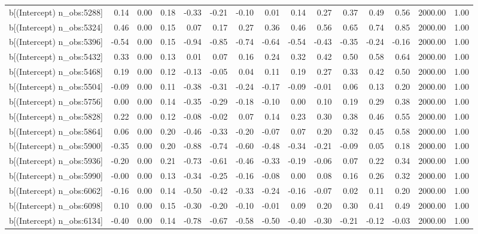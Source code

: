 \begin{table}[ht]
\begin{tabular}{rrrrrrrrrrrrrrr}
  b[(Intercept) n\_obs:5288] & 0.14 & 0.00 & 0.18 & -0.33 & -0.21 & -0.10 & 0.01 & 0.14 & 0.27 & 0.37 & 0.49 & 0.56 & 2000.00 & 1.00 \\ 
  b[(Intercept) n\_obs:5324] & 0.46 & 0.00 & 0.15 & 0.07 & 0.17 & 0.27 & 0.36 & 0.46 & 0.56 & 0.65 & 0.74 & 0.85 & 2000.00 & 1.00 \\ 
  b[(Intercept) n\_obs:5396] & -0.54 & 0.00 & 0.15 & -0.94 & -0.85 & -0.74 & -0.64 & -0.54 & -0.43 & -0.35 & -0.24 & -0.16 & 2000.00 & 1.00 \\ 
  b[(Intercept) n\_obs:5432] & 0.33 & 0.00 & 0.13 & 0.01 & 0.07 & 0.16 & 0.24 & 0.32 & 0.42 & 0.50 & 0.58 & 0.64 & 2000.00 & 1.00 \\ 
  b[(Intercept) n\_obs:5468] & 0.19 & 0.00 & 0.12 & -0.13 & -0.05 & 0.04 & 0.11 & 0.19 & 0.27 & 0.33 & 0.42 & 0.50 & 2000.00 & 1.00 \\ 
  b[(Intercept) n\_obs:5504] & -0.09 & 0.00 & 0.11 & -0.38 & -0.31 & -0.24 & -0.17 & -0.09 & -0.01 & 0.06 & 0.13 & 0.20 & 2000.00 & 1.00 \\ 
  b[(Intercept) n\_obs:5756] & 0.00 & 0.00 & 0.14 & -0.35 & -0.29 & -0.18 & -0.10 & 0.00 & 0.10 & 0.19 & 0.29 & 0.38 & 2000.00 & 1.00 \\ 
  b[(Intercept) n\_obs:5828] & 0.22 & 0.00 & 0.12 & -0.08 & -0.02 & 0.07 & 0.14 & 0.23 & 0.30 & 0.38 & 0.46 & 0.55 & 2000.00 & 1.00 \\ 
  b[(Intercept) n\_obs:5864] & 0.06 & 0.00 & 0.20 & -0.46 & -0.33 & -0.20 & -0.07 & 0.07 & 0.20 & 0.32 & 0.45 & 0.58 & 2000.00 & 1.00 \\ 
  b[(Intercept) n\_obs:5900] & -0.35 & 0.00 & 0.20 & -0.88 & -0.74 & -0.60 & -0.48 & -0.34 & -0.21 & -0.09 & 0.05 & 0.18 & 2000.00 & 1.00 \\ 
  b[(Intercept) n\_obs:5936] & -0.20 & 0.00 & 0.21 & -0.73 & -0.61 & -0.46 & -0.33 & -0.19 & -0.06 & 0.07 & 0.22 & 0.34 & 2000.00 & 1.00 \\ 
  b[(Intercept) n\_obs:5990] & -0.00 & 0.00 & 0.13 & -0.34 & -0.25 & -0.16 & -0.08 & 0.00 & 0.08 & 0.16 & 0.26 & 0.32 & 2000.00 & 1.00 \\ 
  b[(Intercept) n\_obs:6062] & -0.16 & 0.00 & 0.14 & -0.50 & -0.42 & -0.33 & -0.24 & -0.16 & -0.07 & 0.02 & 0.11 & 0.20 & 2000.00 & 1.00 \\ 
  b[(Intercept) n\_obs:6098] & 0.10 & 0.00 & 0.15 & -0.30 & -0.20 & -0.10 & -0.01 & 0.09 & 0.20 & 0.30 & 0.41 & 0.49 & 2000.00 & 1.00 \\ 
  b[(Intercept) n\_obs:6134] & -0.40 & 0.00 & 0.14 & -0.78 & -0.67 & -0.58 & -0.50 & -0.40 & -0.30 & -0.21 & -0.12 & -0.03 & 2000.00 & 1.00 \\ 

\end{tabular}
\end{table}
